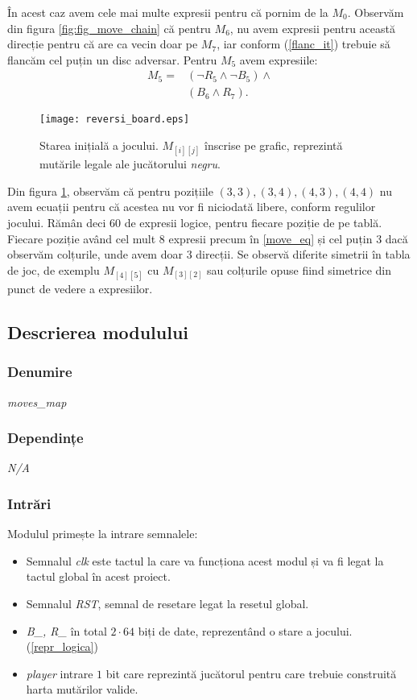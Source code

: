 \documentclass[12pt,twoside,a4paper,fleqn]{book}
\theoremstyle{definition}
\begin{document}
În acest caz avem cele mai multe expresii pentru că pornim de la $M_{0}$. Observăm din figura \ref{fig:fig_move_chain} că pentru $M_{6}$, nu avem expresii pentru această direcție pentru că are ca vecin doar pe $M_{7}$, iar conform (\ref{flanc_it}) trebuie să flancăm cel puțin un disc adversar. Pentru $M_{5}$ avem expresiile:
\begin{align}
M_{5} =& (\lnot R_{5} \land \lnot B_{5}) \land \tag{condiția ca poziția 5 să fie liberă} \\
    &(B_{6} \land R_{7}). \tag{condiția să flancăm poziția 6}
\end{align}


\begin{figure}[h]
\texttt{[image: reversi\_board.eps]}
\caption{\small{Starea inițială a jocului. $M_{[i][j]}$ înscrise pe grafic, reprezintă mutările legale ale jucătorului \emph{negru}.}}
\label{fig:fig_rboard}
\end{figure}

Din figura \ref{fig:fig_rboard}, observăm că pentru pozițiile $(3,3), (3,4), (4,3), (4,4)$ nu avem ecuații pentru că acestea nu vor fi niciodată libere, conform regulilor jocului. Rămân deci $60$ de expresii logice, pentru fiecare poziție de pe tablă. Fiecare poziție având cel mult $8$ expresii precum în \eqref{move_eq} și cel puțin $3$ dacă observăm colțurile, unde avem doar $3$ direcții. Se observă diferite simetrii în tabla de joc, de exemplu $M_{[4][5]}$ cu $M_{[3][2]}$ sau colțurile opuse fiind simetrice din punct de vedere a expresiilor.
\subsection{Descrierea modulului}
\subsubsection{Denumire}
\emph{moves\_map}
\subsubsection{Dependințe}
\emph{N/A}
\subsubsection{Intrări}
Modulul primește la intrare semnalele:
\begin{itemize}
\item Semnalul \emph{clk} este tactul la care va funcționa acest modul și va fi legat la tactul global în acest proiect.
\item Semnalul \emph{RST}, semnal de resetare legat la resetul global.
\item \emph{B\_, R\_} în total $2 \cdot 64$ biți de date, reprezentând o stare a jocului. (\ref{repr_logica})
\item \emph{player} intrare $1$ bit care reprezintă jucătorul pentru care trebuie construită harta mutărilor valide.
\end{itemize}
\end{document}
